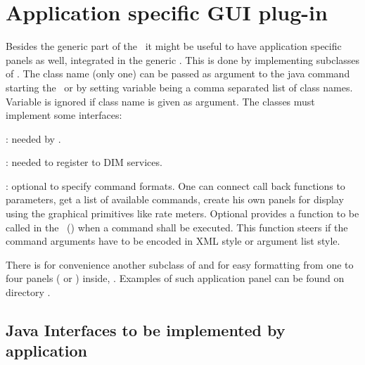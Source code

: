 \section{Application specific GUI plug-in}
Besides the generic part of the \gui\ it might be useful to have application specific panels as well, integrated in the generic \gui. This is done by implementing subclasses of  . The class name (only one) can be passed as argument to the java command starting the \gui\ or by setting variable  being a comma separated list of class names.
Variable is ignored if class name is given as argument.
The classes must implement some interfaces:
\bdes
\item [\class{xiUserPanel}]: needed by \gui.
\item [\class{xiUserInfoHandler}]: needed to register to DIM services.
\item [\class{xiUserCommand}]: optional to specify command formats.
\edes
One can connect call back functions to parameters, 
get a list of available commands,
create his own panels for display using the graphical primitives like rate meters.
Optional  provides a function to be called in the \gui\ 
() when a command shall be executed. This function steers if the command arguments have to be
encoded in XML style or argument list style.

There is for convenience another subclass of  and  for easy formatting from one to four panels 
(\class{JPanel} or \class{xPanelGraphics}) inside,
.
Examples of such application panel can be found on directory .
\subsection{Java Interfaces to be implemented by application}
